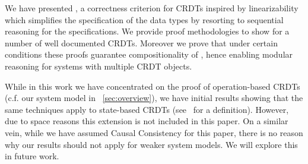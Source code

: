 We have presented \CRDTLin{}, a correctness criterion for CRDTs
inspired by linearizability which simplifies the specification of the
data types by resorting to sequential reasoning for the
specifications.
%
We provide proof methodologies to show \CRDTLinshort{} for a number of
well documented CRDTs.
%
Moreover we prove that under certain conditions these proofs guarantee
compositionality of \CRDTLinshort{}, hence enabling modular reasoning
for systems with multiple CRDT objects.
%

While in this work we have concentrated on the proof of
operation-based CRDTs (c.f. our system model in
\sectionautorefname~\ref{sec:overview}), we have initial results
showing that the same techniques apply to state-based CRDTs
(see~\cite{ShapiroPBZ11} for a definition).
%
However, due to space reasons this extension is not included in this
paper.
%
On a similar vein, while we have assumed Causal Consistency for this
paper, there is no reason why our results should not apply for weaker
system models.
%
We will explore this in future work.


